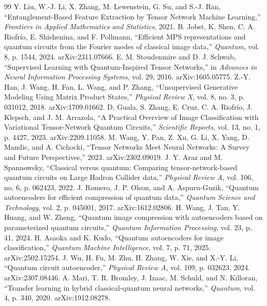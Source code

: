\documentclass[11pt]{article}
\begin{document}
\begin{thebibliography}{99}
 Y. Liu, W.-J. Li, X. Zhang, M. Lewenstein, G. Su, and S.-J. Ran, ``Entanglement-Based Feature Extraction by Tensor Network Machine Learning,'' \textit{Frontiers in Applied Mathematics and Statistics}, 2021.
 B. Jobst, K. Shen, C. A. Riofr\'io, E. Shishenina, and F. Pollmann, ``Efficient MPS representations and quantum circuits from the Fourier modes of classical image data,'' \textit{Quantum}, vol. 8, p. 1544, 2024. arXiv:2311.07666.
 E. M. Stoudenmire and D. J. Schwab, ``Supervised Learning with Quantum-Inspired Tensor Networks,'' in \textit{Advances in Neural Information Processing Systems}, vol. 29, 2016. arXiv:1605.05775.
 Z.-Y. Han, J. Wang, H. Fan, L. Wang, and P. Zhang, ``Unsupervised Generative Modeling Using Matrix Product States,'' \textit{Physical Review X}, vol. 8, no. 3, p. 031012, 2018. arXiv:1709.01662.
 D. Guala, S. Zhang, E. Cruz, C. A. Riofr\'io, J. Klepsch, and J. M. Arrazola, ``A Practical Overview of Image Classification with Variational Tensor-Network Quantum Circuits,'' \textit{Scientific Reports}, vol. 13, no. 1, p. 4427, 2023. arXiv:2209.11058.
 M. Wang, Y. Pan, Z. Xu, G. Li, X. Yang, D. Mandic, and A. Cichocki, ``Tensor Networks Meet Neural Networks: A Survey and Future Perspectives,'' 2023. arXiv:2302.09019.
 J. Y. Araz and M. Spannowsky, ``Classical versus quantum: Comparing tensor-network-based quantum circuits on Large Hadron Collider data,'' \textit{Physical Review A}, vol. 106, no. 6, p. 062423, 2022.
 J. Romero, J. P. Olson, and A. Aspuru-Guzik, ``Quantum autoencoders for efficient compression of quantum data,'' \textit{Quantum Science and Technology}, vol. 2, p. 045001, 2017. arXiv:1612.02806.
 H. Wang, J. Tan, Y. Huang, and W. Zheng, ``Quantum image compression with autoencoders based on parameterized quantum circuits,'' \textit{Quantum Information Processing}, vol. 23, p. 41, 2024.
 H. Asaoka and K. Kudo, ``Quantum autoencoders for image classification,'' \textit{Quantum Machine Intelligence}, vol. 7, p. 71, 2025. arXiv:2502.15254.
 J. Wu, H. Fu, M. Zhu, H. Zhang, W. Xie, and X.-Y. Li, ``Quantum circuit autoencoder,'' \textit{Physical Review A}, vol. 109, p. 032623, 2024. arXiv:2307.08446.
 A. Mari, T. R. Bromley, J. Izaac, M. Schuld, and N. Killoran, ``Transfer learning in hybrid classical-quantum neural networks,'' \textit{Quantum}, vol. 4, p. 340, 2020. arXiv:1912.08278.

\end{thebibliography}
\end{document}
